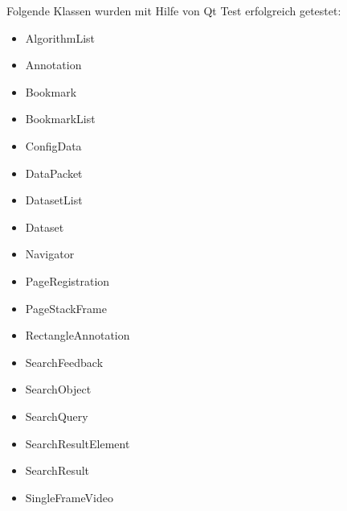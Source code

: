 Folgende Klassen wurden mit Hilfe von Qt Test erfolgreich getestet:
\begin{itemize}
\item AlgorithmList
\item Annotation
\item Bookmark
\item BookmarkList
\item ConfigData
\item DataPacket
\item DatasetList
\item Dataset
\item Navigator
\item PageRegistration
\item PageStackFrame
\item RectangleAnnotation
\item SearchFeedback
\item SearchObject
\item SearchQuery
\item SearchResultElement
\item SearchResult
\item SingleFrameVideo
\end{itemize}